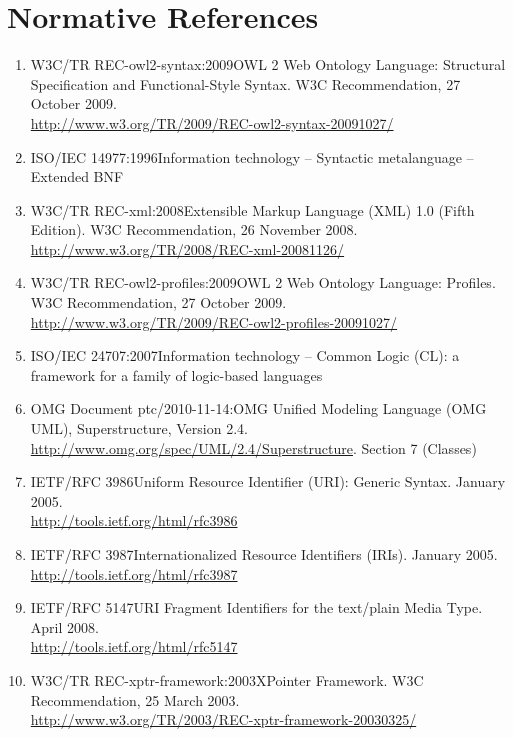 \documentclass[10pt,fleqn,%
\ifpretendfinal
final%
\else
draft%
\fi,
]{scrreprt}
\begin{document}
\chapter{Normative References}
\begin{enumerate}
  \item{W3C/TR REC-owl2-syntax:2009}{OWL 2 Web Ontology Language: Structural Specification and Functional-Style Syntax. W3C Recommendation, 27 October 2009.\\ \url{http://www.w3.org/TR/2009/REC-owl2-syntax-20091027/}}
  \item{ISO/IEC 14977:1996}{Information technology – Syntactic metalanguage – Extended BNF}
  \item{W3C/TR REC-xml:2008}{Extensible Markup Language (XML) 1.0 (Fifth Edition). W3C Recommendation, 26 November 2008. \\
  \url{http://www.w3.org/TR/2008/REC-xml-20081126/}}
  \item{W3C/TR REC-owl2-profiles:2009}{OWL 2 Web Ontology Language: Profiles. W3C Recommendation, 27 October 2009. \\
  \url{http://www.w3.org/TR/2009/REC-owl2-profiles-20091027/}}
  \item{ISO/IEC 24707:2007}{Information technology – Common Logic (CL): a framework for a family of logic-based languages}
  \item{OMG Document ptc/2010-11-14:}{OMG Unified Modeling Language (OMG UML), Superstructure, Version 2.4. \\
  \url{http://www.omg.org/spec/UML/2.4/Superstructure}. Section 7 (Classes)}
  \item{IETF/RFC 3986}{Uniform Resource Identifier (URI): Generic Syntax. January 2005.\\ \url{http://tools.ietf.org/html/rfc3986}}
  \item{IETF/RFC 3987}{Internationalized Resource Identifiers (IRIs). January 2005.\\ \url{http://tools.ietf.org/html/rfc3987}}
  \item{IETF/RFC 5147}{URI Fragment Identifiers for the text/plain Media Type.  April 2008.\\ \url{http://tools.ietf.org/html/rfc5147}}
  \item{W3C/TR REC-xptr-framework:2003}{XPointer Framework.  W3C Recommendation, 25 March 2003. \\ \url{http://www.w3.org/TR/2003/REC-xptr-framework-20030325/}}

\end{enumerate}
\end{document}
